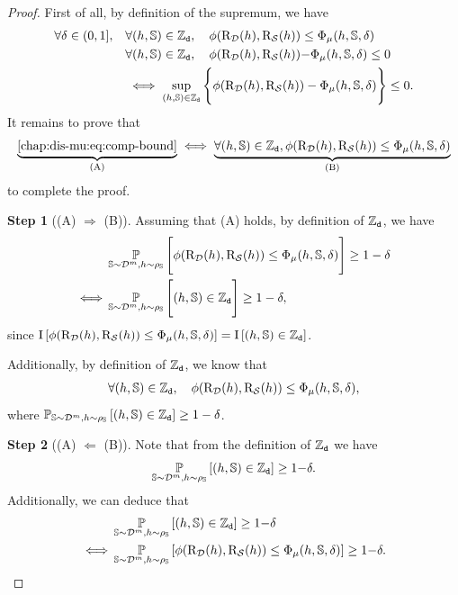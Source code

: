 \begin{noaddcontents}
\propositiondisintegrated*
\begin{proof}
First of all, by definition of the supremum, we have
\begin{align*}
    \forall\delta\in(0,1],\quad &\forall (h, \mathbb{S})\in \mathbb{Z}_{{\tt d}},\quad \phi(\text{R}_{\mathcal{D}}(h), \text{R}_{\mathcal{S}}(h)) \le \Phi_{\operatorname{\mu}}(h,\mathbb{S},\delta)\\
    &\forall (h, \mathbb{S})\in \mathbb{Z}_{{\tt d}},\quad \phi(\text{R}_{\mathcal{D}}(h), \text{R}_{\mathcal{S}}(h)){-}\Phi_{\operatorname{\mu}}(h,\mathbb{S},\delta) \le 0\\
    &\iff  \sup_{(h,\mathbb{S})\in\mathbb{Z}_{{\tt d}}}\Bigg\{ \phi(\text{R}_{\mathcal{D}}(h), \text{R}_{\mathcal{S}}(h)) - \Phi_{\operatorname{\mu}}(h,\mathbb{S},\delta) \Bigg\} \le 0.
\end{align*}
It remains to prove that
\begin{align*}
\underbrace{\text{\Cref{chap:dis-mu:eq:comp-bound}}}_{\text{(A)}} \iff \underbrace{\forall (\h, \S)\in \setD, \phi(\Risk_{\D}(\h), \Risk_{\dS}(\h)) \le \PhiComp(\h, \S, \delta)}_{\text{(B)}}
\end{align*}
to complete the proof.

\textbf{Step 1} ((A) $\Rightarrow$ (B)). 
Assuming that (A) holds, by definition of $\mathbb{Z}_{{\tt d}}$, we have
\begin{align*}
    &\operatorname*{\mathbb{P}}_{\mathbb{S}\sim\mathcal{D}^m, h\sim\rho_{\mathbb{S}}}\Bigg[ \phi(\text{R}_{\mathcal{D}}(h), \text{R}_{\mathcal{S}}(h)) \le \Phi_{\operatorname{\mu}}(h,\mathbb{S},\delta) \Bigg] \ge 1-\delta\\
    \iff &\operatorname*{\mathbb{P}}_{\mathbb{S}\sim\mathcal{D}^m, h\sim\rho_{\mathbb{S}}}\Bigg[ (h, \mathbb{S})\in\mathbb{Z}_{{\tt d}} \Bigg] \ge 1-\delta,
\end{align*}
since $\operatorname{I}\left[ \phi(\text{R}_{\mathcal{D}}(h), \text{R}_{\mathcal{S}}(h)) \le \Phi_{\operatorname{\mu}}(h,\mathbb{S},\delta) \right] = \operatorname{I}\left[ (h, \mathbb{S})\in\mathbb{Z}_{{\tt d}} \right]$.

Additionally, by definition of $\mathbb{Z}_{{\tt d}}$, we know that
\begin{align*}
    \forall (h, \mathbb{S})\in \mathbb{Z}_{{\tt d}}, \quad \phi(\text{R}_{\mathcal{D}}(h), \text{R}_{\mathcal{S}}(h)) \le \Phi_{\operatorname{\mu}}(h,\mathbb{S},\delta),
\end{align*}
where $\operatorname*{\mathbb{P}}_{\mathbb{S}\sim\mathcal{D}^m, h\sim\rho_{\mathbb{S}}}\left[ (h, \mathbb{S})\in\mathbb{Z}_{{\tt d}} \right] \ge 1-\delta$.

\textbf{Step 2} ((A) $\Leftarrow$ (B)).
Note that from the definition of $\mathbb{Z}_{{\tt d}}$ we have
\begin{align*}
    \operatorname*{\mathbb{P}}_{\mathbb{S}\sim\mathcal{D}^m, h\sim\rho_{\mathbb{S}}}\left[ (h, \mathbb{S})\in\mathbb{Z}_{{\tt d}} \right] \ge  1{-}\delta.
\end{align*}
Additionally, we can deduce that
\begin{align*}
    &\operatorname*{\mathbb{P}}_{\mathbb{S}\sim\mathcal{D}^m, h\sim\rho_{\mathbb{S}}}\left[ (h, \mathbb{S})\in\mathbb{Z}_{{\tt d}} \right] \ge  1{-}\delta\\
    \iff &\operatorname*{\mathbb{P}}_{\mathbb{S}\sim\mathcal{D}^m, h\sim\rho_{\mathbb{S}}}\left[ \phi(\text{R}_{\mathcal{D}}(h), \text{R}_{\mathcal{S}}(h)) \le \Phi_{\operatorname{\mu}}(h,\mathbb{S},\delta) \right] \ge  1{-}\delta.
\end{align*}
\end{proof}


\end{noaddcontents}
